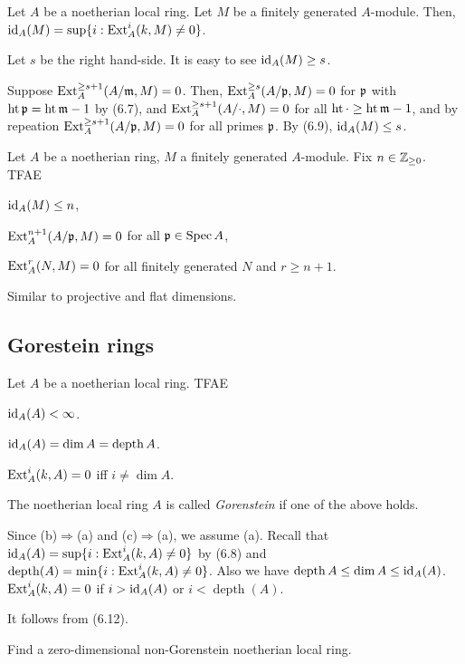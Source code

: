 \documentclass{../../../small}
\newcommand{\depth}{\operatorname{depth}}
\newcommand{\hgt}{\operatorname{ht}}
\begin{document}
\begin{thm*}[6.8]
Let $A$ be a noetherian local ring.
Let $M$ be a finitely generated $A$-module.
Then, $\operatorname{id}_A(M)=\sup\{i:\operatorname{Ext}_A^i(k,M)\ne0\}$.
\end{thm*}
\begin{pf}
Let $s$ be the right hand-side.
It is easy to see $\operatorname{id}_A(M)\ge s$.

Suppose $\operatorname{Ext}_A^{\ge s+1}(A/\mathfrak{m},M)=0$.
Then, $\operatorname{Ext}_A^{\ge s}(A/\mathfrak{p},M)=0$ for $\mathfrak{p}$ with $\hgt\fp=\hgt\fm-1$ by (6.7), and $\operatorname{Ext}_A^{\ge s+1}(A/\cdot,M)=0$ for all $\hgt\cdot\ge\hgt\fm-1$, and by repeation $\operatorname{Ext}_A^{\ge s+1}(A/\mathfrak{p},M)=0$ for all primes $\mathfrak{p}$.
By (6.9), $\operatorname{id}_A(M)\le s$.
\end{pf}

\begin{lem*}[6.9]
Let $A$ be a noetherian ring, $M$ a finitely generated $A$-module.
Fix $n\in\mathbb{Z}_{\ge0}$. TFAE
\begin{parts}
\item $\operatorname{id}_A(M)\le n$,
\item $\operatorname{Ext}_A^{n+1}(A/\mathfrak{p},M)=0$ for all $\mathfrak{p}\in\operatorname{Spec} A$,
\item $\operatorname{Ext}_A^r(N,M)=0$ for all finitely generated $N$ and $r\ge n+1$.
\end{parts}
\end{lem*}
\begin{pf}
Similar to projective and flat dimensions.
\end{pf}

\subsection*{Gorestein rings}



\begin{thm*}[6.10]
Let $A$ be a noetherian local ring.
TFAE
\begin{parts}
\item $\operatorname{id}_A(A)<\infty$.
\item $\id_A(A)=\dim A=\depth A$.
\item $\operatorname{Ext}_A^i(k,A)=0$ iff $i\ne\dim A$.
\end{parts}
The noetherian local ring $A$ is called \emph{Gorenstein} if one of the above holds.
\end{thm*}
\begin{pf}
Since (b)$\Rightarrow$(a) and (c)$\Rightarrow$(a), we assume (a).
Recall that $\operatorname{id}_A(A)=\sup\{i:\operatorname{Ext}_A^i(k,A)\ne0\}$ by (6.8) and $\depth(A)=\min\{i:\Ext_A^i(k,A)\ne0\}$.
Also we have $\depth A\le\dim A\le\id_A(A)$.
$\operatorname{Ext}_A^i(k,A)=0$ if $i>\operatorname{id}_A(A)$ or $i<\depth(A)$.

It follows from (6.12).
\end{pf}
\begin{exe*}[6.11]
Find a zero-dimensional non-Gorenstein noetherian local ring.
\end{exe*}
\end{document}

